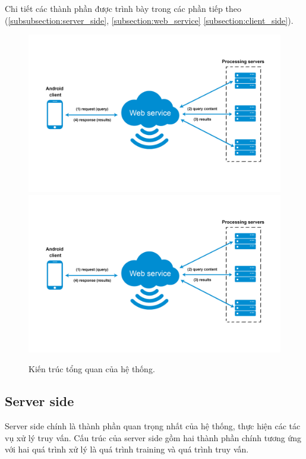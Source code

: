 Chi tiết các thành phần được trình bày trong các phần tiếp theo (\ref{subsubsection:server_side}, \ref{subsection:web_service} \ref{subsection:client_side}).

\begin{figure}[!htbp]
  \begin{center}
    \leavevmode
    \ifpdf
      \includegraphics[scale=0.14]{architecture}
    \else
      \includegraphics[scale=0.14]{architecture}
    \fi
    \caption[Kiến trúc tổng quan của hệ thống]{Kiến trúc tổng quan của hệ thống.}
    \label{FigArchitecture}
  \end{center}
\end{figure}

\subsection{Server side}
\label{subsection:server_side}
Server side chính là thành phần quan trọng nhất của hệ thống, thực hiện các tác vụ xử lý truy vấn. Cấu trúc của server side gồm hai thành phần chính tương ứng với hai quá trình xử lý là quá trình training và quá trình truy vấn.

